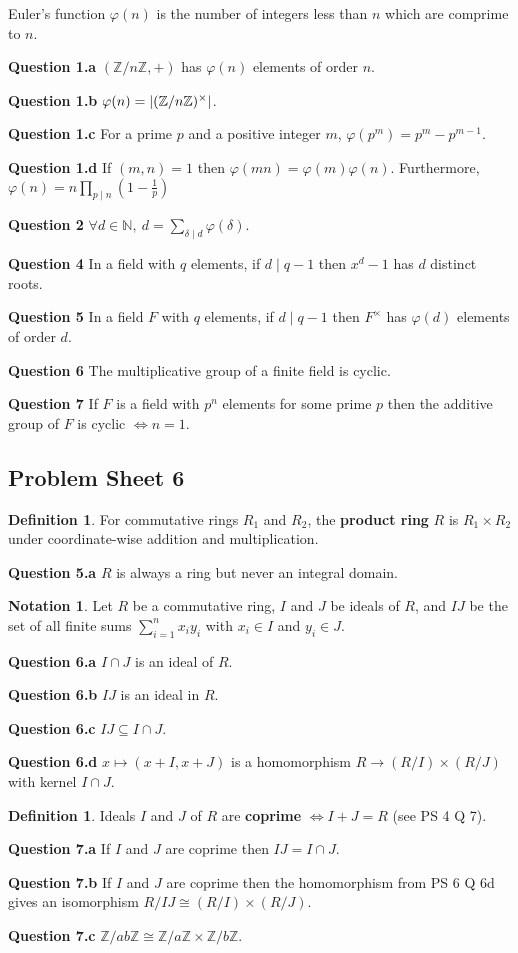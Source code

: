 \documentclass[12pt]{article}
\theoremstyle{definition}
\newtheorem{defn}[thm]{Definition}
\newtheorem*{not*}{Notation}
\DeclarePairedDelimiter\abs{\lvert}{\rvert}
\newcommand{\N}{\mathbb{N}}
\newcommand{\Z}{\mathbb{Z}}
\newcommand{\question}[1]{\noindent\textbf{Question #1} }
\begin{document}
Euler's function $\varphi(n)$ is the number of integers less than $n$ which are comprime to $n$.

\question{1.a} $(\Z / n\Z, +)$ has $\varphi(n)$ elements of order $n$.

\question{1.b} $\varphi(n) = \abs{(\Z / n\Z)^{\times}}$.

\question{1.c} For a prime $p$ and a positive integer $m$, $\varphi(p^m) = p^m - p^{m - 1}$.

\question{1.d} If $(m, n) = 1$ then $\varphi(mn) = \varphi(m)\varphi(n)$. Furthermore, $\varphi(n) = n\prod_{p \mid n}\left(1 - \frac{1}{p}\right)$

\question{2} $\forall d \in \N,\ d = \sum_{\delta \mid d}\varphi(\delta)$.

\question{4} In a field with $q$ elements, if $d \mid q - 1$ then $x^d - 1$ has $d$ distinct roots.

\question{5} In a field $F$ with $q$ elements, if $d \mid q - 1$ then $F^{\times}$ has $\varphi(d)$ elements of order $d$.

\question{6} The multiplicative group of a finite field is cyclic.

\question{7} If $F$ is a field with $p^n$ elements for some prime $p$ then the additive group of $F$ is cyclic $\iff n = 1$.

\subsection{Problem Sheet 6}

\begin{defn}
  For commutative rings $R_1$ and $R_2$, the \textbf{product ring} $R$ is $R_1 \times R_2$ under coordinate-wise addition and multiplication.
\end{defn}

\question{5.a} $R$ is always a ring but never an integral domain.
\\

\begin{not*}
  Let $R$ be a commutative ring, $I$ and $J$ be ideals of $R$, and $IJ$ be the set of all finite sums $\sum_{i = 1}^nx_iy_i$ with $x_i \in I$ and $y_i \in J$.
\end{not*}

\question{6.a} $I \cap J$ is an ideal of $R$.

\question{6.b} $IJ$ is an ideal in $R$.

\question{6.c} $IJ \subseteq I \cap J$.

\question{6.d} $x \mapsto (x + I, x + J)$ is a homomorphism $R \to (R / I) \times (R / J)$ with kernel $I \cap J$.

\begin{defn}
  Ideals $I$ and $J$ of $R$ are \textbf{coprime} $\iff I + J = R$ (see PS 4 Q 7).
\end{defn}

\question{7.a} If $I$ and $J$ are coprime then $IJ = I \cap J$.

\question{7.b} If $I$ and $J$ are coprime then the homomorphism from PS 6 Q 6d gives an isomorphism $R / IJ \cong (R / I) \times (R / J)$.

\question{7.c} $\Z / ab\Z \cong \Z / a\Z \times \Z / b\Z$.
\end{document}
